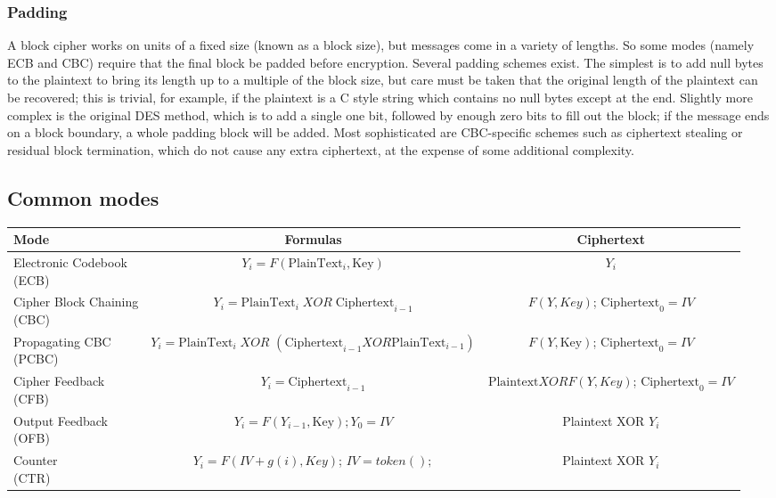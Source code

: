 \documentclass[a4paper, 10pt, titlepage]{article}
\begin{document}
\subsubsection*{Padding}
A block cipher works on units of a fixed size (known as a block size), but messages come in a variety of lengths. So some modes (namely ECB and CBC) require that the final block be padded before encryption. Several padding schemes exist. The simplest is to add null bytes to the plaintext to bring its length up to a multiple of the block size, but care must be taken that the original length of the plaintext can be recovered; this is trivial, for example, if the plaintext is a C style string which contains no null bytes except at the end. Slightly more complex is the original DES method, which is to add a single one bit, followed by enough zero bits to fill out the block; if the message ends on a block boundary, a whole padding block will be added. Most sophisticated are CBC-specific schemes such as ciphertext stealing or residual block termination, which do not cause any extra ciphertext, at the expense of some additional complexity.

\subsection*{Common modes}
\begin{tabular}{|l|c|c|}\hline
Mode & Formulas & Ciphertext \\ \hline
\makecell{Electronic Codebook \\(ECB)} & $Y_i = F(\text{PlainText}_i,\text{Key})$ & $Y_i$ \\ \hline
\makecell{Cipher Block Chaining \\(CBC)} & $Y_i = \text{PlainText}_i \; XOR \; \text{Ciphertext}_{i-1}$ & \makecell{$F(Y,Key)$;\\$\text{Ciphertext}_0 = IV$} \\ \hline
\makecell{Propagating CBC \\(PCBC)} & \makecell{$Y_i = \text{PlainText}_i \; XOR$ \\ $(\text{Ciphertext}_{i-1} XOR \text{PlainText}_{i-1} )$} & \makecell{$F(Y,\text{Key})$;\\$\text{Ciphertext}_0 =IV$} \\ \hline
\makecell{Cipher Feedback \\(CFB)} & $Y_i = \text{Ciphertext}_{i-1}$  &
\makecell{$\text{Plaintext} XOR F(Y,Key)$;\\$\text{Ciphertext}_0 =IV$} \\ \hline
\makecell{Output Feedback \\(OFB)} & $Y_i =F(Y_{i-1},\text{Key}); Y_0 = IV$ & Plaintext XOR $Y_i$ \\\hline
\makecell{Counter \\(CTR)} & \makecell{$Y_i =F(IV + g(i),Key)$;\\$IV=token();$} & Plaintext XOR $Y_i$ \\ \hline
\end{tabular}
\end{document}
